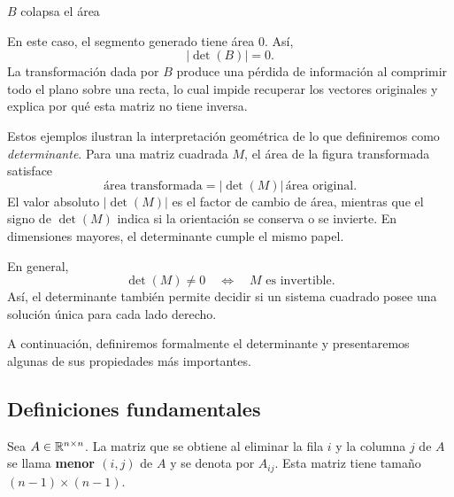 \documentclass[compacto,10pt]{pubciencias-notas}
\begin{document}
\begin{center}
\begin{minipage}[t]{0.52\textwidth}
    \centering

    $B$ colapsa el área
\end{minipage}
\end{center}
En este caso, el segmento generado tiene área 0. Así,
\[
    |\det(B)|=0.
\]
La transformación dada por $B$ produce una pérdida de información al comprimir todo el plano sobre una recta, lo cual impide recuperar los vectores originales y explica por qué esta matriz no tiene inversa.

Estos ejemplos ilustran la interpretación geométrica de lo que definiremos como \emph{determinante}. Para una matriz cuadrada $M$, el área de la figura transformada satisface
\[
    \text{área transformada}
    =|\det(M)|\,\text{área original}.
\]
El valor absoluto $|\det(M)|$ es el factor de cambio de área, mientras que el signo de $\det(M)$ indica si la orientación se conserva o se invierte. En dimensiones mayores, el determinante cumple el mismo papel.

En general,
\[
    \det(M)\ne0
    \quad\Longleftrightarrow\quad
    M\text{ es invertible}.
\]
Así, el determinante también permite decidir si un sistema cuadrado posee una solución única para cada lado derecho.

A continuación, definiremos formalmente el determinante y presentaremos algunas de sus propiedades más importantes.

\subsection{Definiciones fundamentales}

\setcounter{defi}{0}
\begin{defi}[Menor]\label{sem04cl02:def-menor}
    Sea $A\in\Mat[\R]{n}{n}$. La matriz que se obtiene al eliminar la fila
    $i$ y la columna $j$ de $A$ se llama \textbf{menor $(i,j)$} de $A$ y se
    denota por $A_{ij}$. Esta matriz tiene tamaño $(n-1)\times(n-1)$.
\end{defi}
\end{document}
